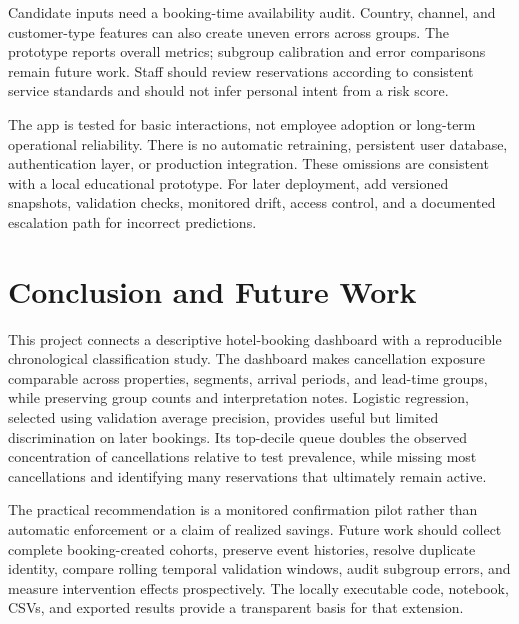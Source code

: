 \documentclass[conference]{IEEEtran}
\begin{document}
Candidate inputs need a booking-time availability audit. Country, channel, and customer-type features can also create uneven errors across groups. The prototype reports overall metrics; subgroup calibration and error comparisons remain future work. Staff should review reservations according to consistent service standards and should not infer personal intent from a risk score.

The app is tested for basic interactions, not employee adoption or long-term operational reliability. There is no automatic retraining, persistent user database, authentication layer, or production integration. These omissions are consistent with a local educational prototype. For later deployment, add versioned snapshots, validation checks, monitored drift, access control, and a documented escalation path for incorrect predictions.

\section{Conclusion and Future Work}
This project connects a descriptive hotel-booking dashboard with a reproducible chronological classification study. The dashboard makes cancellation exposure comparable across properties, segments, arrival periods, and lead-time groups, while preserving group counts and interpretation notes. Logistic regression, selected using validation average precision, provides useful but limited discrimination on later bookings. Its top-decile queue doubles the observed concentration of cancellations relative to test prevalence, while missing most cancellations and identifying many reservations that ultimately remain active.

The practical recommendation is a monitored confirmation pilot rather than automatic enforcement or a claim of realized savings. Future work should collect complete booking-created cohorts, preserve event histories, resolve duplicate identity, compare rolling temporal validation windows, audit subgroup errors, and measure intervention effects prospectively. The locally executable code, notebook, CSVs, and exported results provide a transparent basis for that extension.
\end{document}
